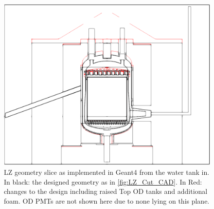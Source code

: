 \begin{figure}[!tbph]
\includegraphics[width=\textwidth]{Figures/Geometry/geometry_differences_black_and_white.png}
\centering
\caption{LZ geometry slice as implemented in Geant4 from the water tank in. In black: the designed geometry as in \autoref{fig:LZ_Cut_CAD}. In Red: changes to the design including raised Top OD tanks and additional foam. OD PMTs are not shown here due to none lying on this plane.}
\label{fig:Geometry_Differences}
\end{figure}


